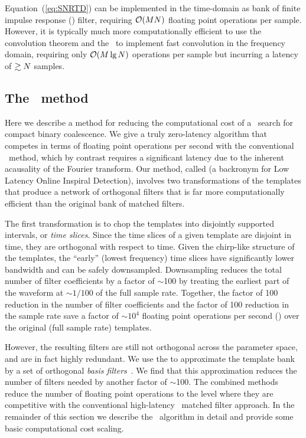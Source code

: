 Equation~(\ref{eq:SNRTD}) can be implemented in the time-domain as bank of
finite impulse response (\fir) filter, requiring $\mathcal O(M
N)$ floating point operations per sample.  However, it is typically
much more computationally efficient to use the convolution theorem and the
\fft\ to implement fast convolution in the frequency domain, requiring only
$\mathcal O(M \lg N)$ operations per sample but incurring
a latency of $\gtrsim N$ samples.


\subsection{The \lloid\ method}

Here we describe a method for reducing the computational cost of a \TD\ search
for compact binary coalescence.  We give a truly zero-latency algorithm
that competes in terms of floating point operations per second with the
conventional \FD\ method, which by contrast requires a significant latency due to the
inherent acausality of the Fourier transform.  Our method, called \lloid{}
(a backronym for Low Latency Online Inspiral Detection),
involves two transformations of the templates that produce a
network of orthogonal filters that is far more computationally
efficient than the original bank of matched filters.

The first transformation is to chop the templates into disjointly supported
intervals, or \emph{time slices}.  Since the time slices of a given template
are disjoint in time, they are orthogonal with respect to time.  Given the
chirp-like structure of the templates, the ``early'' (lowest frequency) time
slices have significantly lower bandwidth and can be safely downsampled.
Downsampling reduces the total number of filter coefficients by a factor of
$\sim$100 by treating the earliest part of the waveform at $\sim$$1/100$ of
the full sample rate.  Together, the factor of 100 reduction in the number of
filter coefficients and the factor of 100 reduction in the sample rate save a
factor of $\sim 10^4$ floating point operations per second (\flops) over the
original (full sample rate) templates.

However, the resulting filters are still not
orthogonal across the parameter space, and are in fact highly redundant.
We use the \SVD{} to approximate the template bank by a set of orthogonal
\emph{basis filters}~\citep{Cannon:2010p10398}.  We find that this approximation
reduces the number of filters needed by another factor of
$\sim$100.  The combined methods reduce the number of floating point operations
to the level where they are competitive with the conventional high-latency \FD\
matched filter approach.  In the remainder of this section we describe the
\lloid\ algorithm in detail and provide some basic computational cost scaling.

